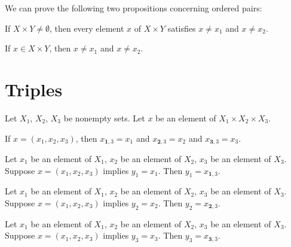 \documentclass{article}
\begin{document}
We can prove the following two propositions concerning ordered pairs:
\begin{thm}
\item\label{mcart1:62} If $X\times Y\neq\emptyset$, then every element
  $x$ of $X\times Y$ satisfies $x\neq x_{1}$ and $x\neq x_{2}$.
\item\label{mcart1:63} If $x\in X\times Y$,
  then $x\neq x_{1}$ and $x\neq x_{2}$.
\end{thm}

\section{Triples}

Let $X_{1}$, $X_{2}$, $X_{3}$ be nonempty sets. Let $x$ be an element of
$X_{1}\times X_{2}\times X_{3}$.
\begin{thm}
\item\label{mcart1:64} If $x=(x_{1},x_{2},x_{3})$, then
  $x_{\mathbf{1},3}=x_{1}$ and
  $x_{\mathbf{2},3}=x_{2}$ and
  $x_{\mathbf{3},3}=x_{3}$.
\item\label{mcart1:65} Let $x_{1}$ be an element of $X_{1}$,
  $x_{2}$ be an element of $X_{2}$,
  $x_{3}$ be an element of $X_{3}$.
  Suppose $x=(x_{1},x_{2},x_{3})$ implies $y_{1}=x_{1}$.
  Then $y_{1}=x_{\mathbf{1},3}$.
\item\label{mcart1:66} Let $x_{1}$ be an element of $X_{1}$,
  $x_{2}$ be an element of $X_{2}$,
  $x_{3}$ be an element of $X_{3}$.
  Suppose $x=(x_{1},x_{2},x_{3})$ implies $y_{2}=x_{2}$.
  Then $y_{2}=x_{\mathbf{2},3}$.
\item\label{mcart1:67} Let $x_{1}$ be an element of $X_{1}$,
  $x_{2}$ be an element of $X_{2}$,
  $x_{3}$ be an element of $X_{3}$.
  Suppose $x=(x_{1},x_{2},x_{3})$ implies $y_{3}=x_{3}$.
  Then $y_{3}=x_{\mathbf{3},3}$.
\end{thm}
\end{document}
